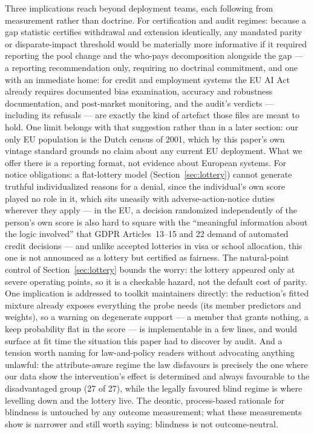 \documentclass[9pt,conference]{IEEEtran}
\begin{document}
Three implications reach beyond deployment teams, each following from measurement rather
than doctrine. For certification and audit regimes: because a gap statistic certifies
withdrawal and extension identically, any mandated parity or disparate-impact threshold
would be materially more informative if it required reporting the pool change and the
who-pays decomposition alongside the gap --- a reporting recommendation only, requiring
no doctrinal commitment, and one with an immediate home: for credit and employment
systems the EU AI Act already requires documented bias examination, accuracy and
robustness documentation, and post-market monitoring, and the audit's verdicts ---
including its refusals --- are exactly the kind of artefact those files are meant to
hold. One limit belongs with that suggestion rather than in a later section: our only
EU population is the Dutch census of 2001, which by this paper's own vintage standard
grounds no claim about any current EU deployment. What we offer there is a reporting
format, not evidence about European systems. For notice obligations: a flat-lottery model
(Section~\ref{sec:lottery}) cannot generate truthful individualized reasons for a denial,
since the individual's own score played no role in it, which sits uneasily with
adverse-action-notice duties wherever they apply --- in the EU, a decision randomized
independently of the person's own score is also hard to square with the ``meaningful
information about the logic involved'' that GDPR Articles~13--15 and 22 demand of
automated credit decisions --- and unlike accepted lotteries in visa
or school allocation, this one is not announced as a lottery but certified as fairness.
The natural-point control of Section~\ref{sec:lottery} bounds the worry: the lottery
appeared only at severe operating points, so it is a checkable hazard, not the default
cost of parity. One implication is addressed to toolkit maintainers directly: the
reduction's fitted mixture already exposes everything the probe needs (its member
predictors and weights), so a warning on degenerate support --- a member that grants
nothing, a keep probability flat in the score --- is implementable in a few lines, and
would surface at fit time the situation this paper had to discover by audit.
And a tension worth naming for law-and-policy readers without advocating anything unlawful:
the attribute-aware regime the law disfavours is precisely the one where our data show the
intervention's effect is determined and always favourable to the disadvantaged group
(27 of 27), while the legally favoured blind regime is where levelling down and the
lottery live. The deontic, process-based rationale for blindness is untouched by any
outcome measurement; what these measurements show is narrower and still worth saying:
blindness is not outcome-neutral.
\end{document}
